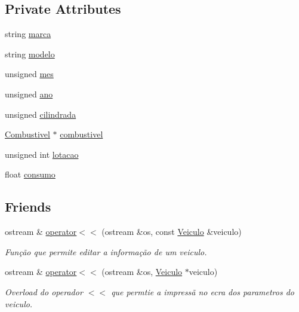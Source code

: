 \subsection*{Private Attributes}
\begin{DoxyCompactItemize}
\item 
string \hyperlink{class_veiculo_ab20b89442a0ddaedd074bb0de75838c8}{marca}
\item 
string \hyperlink{class_veiculo_a313c15811b7fffa4787eea0dcf12fc13}{modelo}
\item 
unsigned \hyperlink{class_veiculo_ac4146f7b3d38e31e3225074e0fb0dea9}{mes}
\item 
unsigned \hyperlink{class_veiculo_ae141824a9353b3f7ed99d5c34c830fe2}{ano}
\item 
unsigned \hyperlink{class_veiculo_a3c3b3f2f958a98b48fa5e4f46007c9f9}{cilindrada}
\item 
\hyperlink{class_combustivel}{Combustivel} $\ast$ \hyperlink{class_veiculo_ad8416cc9da449baed5e07ed146572712}{combustivel}
\item 
unsigned int \hyperlink{class_veiculo_af9dc20956b1b60e54b9a79f76cd971d3}{lotacao}
\item 
float \hyperlink{class_veiculo_ab403615f82fdad74215512cedce23762}{consumo}
\end{DoxyCompactItemize}
\subsection*{Friends}
\begin{DoxyCompactItemize}
\item 
ostream \& \hyperlink{class_veiculo_abd6e2d8cf61fd95d821137237fe1d043}{operator$<$$<$} (ostream \&os, const \hyperlink{class_veiculo}{Veiculo} \&veiculo)
\begin{DoxyCompactList}\small\item\em Função que permite editar a informação de um veiculo. \end{DoxyCompactList}\item 
ostream \& \hyperlink{class_veiculo_ab1e5fb7dfcdaf15014ab3363dd4f8dc1}{operator$<$$<$} (ostream \&os, \hyperlink{class_veiculo}{Veiculo} $\ast$veiculo)
\begin{DoxyCompactList}\small\item\em Overload do operador $<$$<$ que permtie a impressã no ecra dos parametros do veiculo. \end{DoxyCompactList}\end{DoxyCompactItemize}


